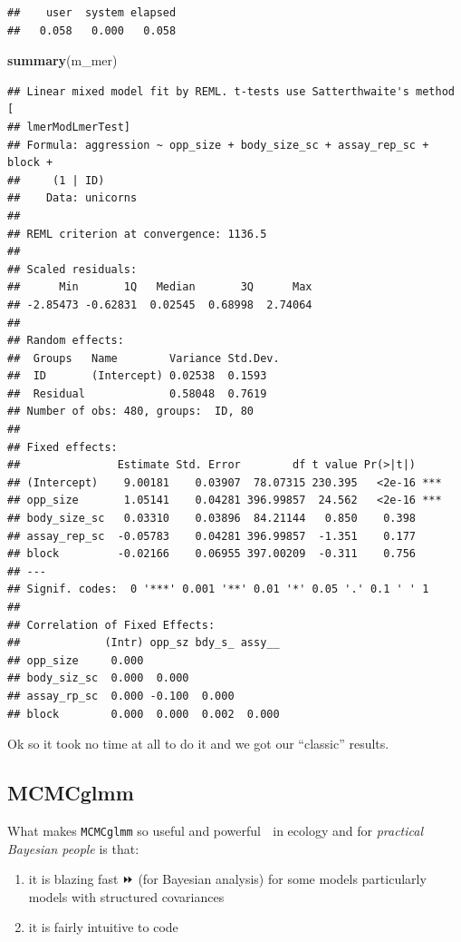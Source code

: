 \documentclass[
  12pt,
]{book}
\newenvironment{Shaded}{\begin{snugshade}}{\end{snugshade}}
\newcommand{\KeywordTok}[1]{\textcolor[rgb]{0.13,0.29,0.53}{\textbf{#1}}}
\newcommand{\NormalTok}[1]{#1}
\providecommand{\tightlist}{%
  \setlength{\itemsep}{0pt}\setlength{\parskip}{0pt}}
\begin{document}
\begin{verbatim}
##    user  system elapsed 
##   0.058   0.000   0.058
\end{verbatim}

\begin{Shaded}
\begin{Highlighting}[]
\KeywordTok{summary}\NormalTok{(m\_mer)}
\end{Highlighting}
\end{Shaded}

\begin{verbatim}
## Linear mixed model fit by REML. t-tests use Satterthwaite's method [
## lmerModLmerTest]
## Formula: aggression ~ opp_size + body_size_sc + assay_rep_sc + block +  
##     (1 | ID)
##    Data: unicorns
## 
## REML criterion at convergence: 1136.5
## 
## Scaled residuals: 
##      Min       1Q   Median       3Q      Max 
## -2.85473 -0.62831  0.02545  0.68998  2.74064 
## 
## Random effects:
##  Groups   Name        Variance Std.Dev.
##  ID       (Intercept) 0.02538  0.1593  
##  Residual             0.58048  0.7619  
## Number of obs: 480, groups:  ID, 80
## 
## Fixed effects:
##               Estimate Std. Error        df t value Pr(>|t|)    
## (Intercept)    9.00181    0.03907  78.07315 230.395   <2e-16 ***
## opp_size       1.05141    0.04281 396.99857  24.562   <2e-16 ***
## body_size_sc   0.03310    0.03896  84.21144   0.850    0.398    
## assay_rep_sc  -0.05783    0.04281 396.99857  -1.351    0.177    
## block         -0.02166    0.06955 397.00209  -0.311    0.756    
## ---
## Signif. codes:  0 '***' 0.001 '**' 0.01 '*' 0.05 '.' 0.1 ' ' 1
## 
## Correlation of Fixed Effects:
##             (Intr) opp_sz bdy_s_ assy__
## opp_size     0.000                     
## body_siz_sc  0.000  0.000              
## assay_rp_sc  0.000 -0.100  0.000       
## block        0.000  0.000  0.002  0.000
\end{verbatim}

Ok so it took no time at all to do it and we got our ``classic'' results.

\hypertarget{mcmcglmm}{%
\subsection{MCMCglmm}\label{mcmcglmm}}

What makes \texttt{MCMCglmm} so useful and powerful 💪 in ecology and for \emph{practical Bayesian people} is that:

\begin{enumerate}
\def\labelenumi{\arabic{enumi}.}
\tightlist
\item
  it is blazing fast ⏩ (for Bayesian analysis) for some models particularly models with structured covariances
\item
  it is fairly intuitive to code
\end{enumerate}
\end{document}
